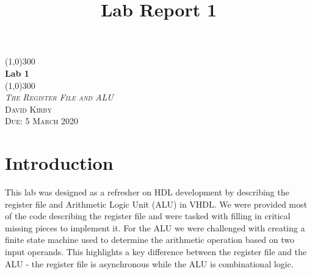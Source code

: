 \documentclass{article}
\title{Lab Report 1}
\begin{document}
 \begin{titlepage}
 \vspace*{\fill}
 	\begin{center}
     \line(1,0){300}\\[0.65cm]
 	\Huge{\bfseries Lab 1}\\
 	 \line(1,0){300}\\
 	\textsc{\huge \textit{The Register File and ALU}}\\
 	\textsc{\LARGE David Kirby}\\
 	\textsc{\Large Due: 5 March 2020}\\[5.5cm]
 	\end{center}
 	\vfill
 \end{titlepage}

\section*{Introduction}
This lab was designed as a refresher on HDL development by describing the register file and Arithmetic Logic Unit (ALU) in VHDL. We were provided most of the code describing the register file and were tasked with filling in critical missing pieces to implement it. For the ALU we were challenged with creating a finite state machine used to determine the arithmetic operation based on two input operands. This highlights a key difference between the register file and the ALU - the register file is asynchronous while the ALU is combinational logic.
\end{document}
